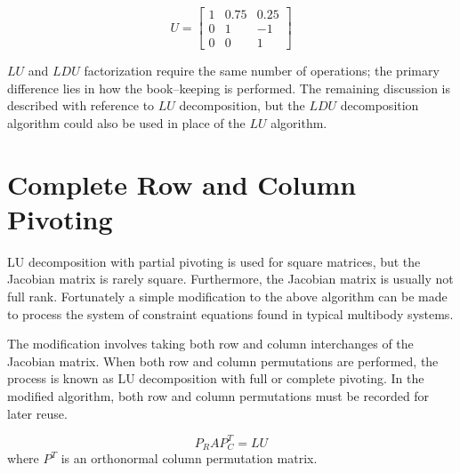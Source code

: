 \documentclass[12pt]{article}   %
\begin{document}
\begin{equation}
U=\left[
\begin{array}{ccc}
1 & 0.75 & 0.25 \\
0 & 1 & -1\\
0 & 0 & 1
\end{array}
\right]
\end{equation}

$LU$ and $LDU$ factorization require the same number of operations; the primary difference lies in how the book--keeping is performed. The remaining discussion is described with reference to $LU$ decomposition, but the $LDU$ decomposition algorithm could also be used in place of the $LU$ algorithm.

\section{Complete Row and Column Pivoting}
LU decomposition with partial pivoting is used for square matrices, but the Jacobian matrix is rarely square. Furthermore, the Jacobian matrix is usually not full rank. Fortunately a simple modification to the above algorithm can be made to process the system of constraint equations found in typical multibody systems.

The modification involves taking both row and column interchanges of the Jacobian matrix. When both row and column permutations are performed, the process is known as LU decomposition with full or complete pivoting. In the modified algorithm, both row and column permutations must be recorded for later reuse.

\begin{equation}
P_RAP_C^T=LU
\label{eq:PAPLU}
\end{equation}
where $P^T$ is an orthonormal column permutation matrix.
\end{document}
